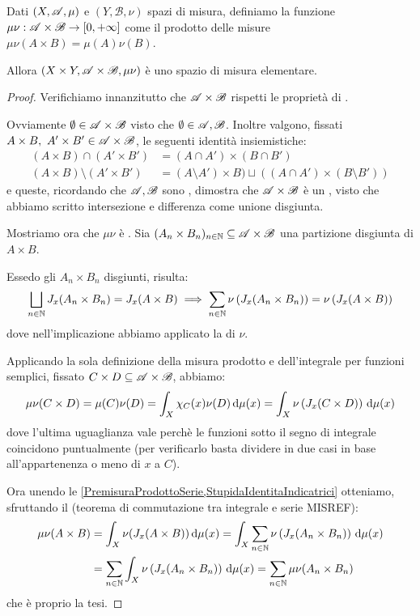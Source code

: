 \newcommand{\B}{\ensuremath{\mathscr B}}
\begin{theorem}
	Dati $(X,\mathscr A,\mu)$ e $(Y,\B,\nu)$ spazi di misura, definiamo la funzione $\mu\nu:\A\times\B\to\Rpiu$ come il prodotto delle misure $\mu\nu(A\times B)=\mu(A)\nu(B)$.
	
	Allora $(X\times Y,\A\times\B,\mu\nu)$ è uno spazio di misura elementare.
\end{theorem}
\begin{proof}
	Verifichiamo innanzitutto che $\A\times\B$ rispetti le proprietà di \semiring{}.
	
	Ovviamente $\emptyset\in\A\times\B$ visto che $\emptyset\in\A,\B$. 
	Inoltre valgono, fissati $A\times B,\ A'\times B'\in\A\times\B$, le seguenti identità insiemistiche:
	\begin{align*}
		(A\times B)\cap (A'\times B') &= (A\cap A')\times(B\cap B')\\
		(A\times B)\setminus (A'\times B') &= (A\setminus A')\times B)\sqcup( (A\cap A')\times (B\setminus B') )
	\end{align*}
	e queste, ricordando che $\A,\B$ sono \sigalg[e], dimostra che $\A\times\B$ è un \semiring{}, visto che abbiamo scritto intersezione e differenza come unione disgiunta.
	
	Mostriamo ora che $\mu\nu$ è \sigadd{}. Sia $(A_n\times B_n)_{n\in\N}\subseteq \A\times \B$ una partizione disgiunta di $A\times B$.
	
	Essedo gli $A_n\times B_n$ disgiunti, risulta:
	\begin{equation}\label{PremisuraProdottoSerie}
		\bigsqcup_{n\in\mathbb N} J_x(A_n\times B_n) = J_x(A\times B)  \implies \sum_{n\in\mathbb N}\nu\left(J_x(A_n\times B_n)\right)=\nu\left(J_x(A\times B)\right)
	\end{equation}
	dove nell'implicazione abbiamo applicato la \sigadd[ità] di $\nu$.
	
	Applicando la sola definizione della misura prodotto e dell'integrale per funzioni semplici, fissato $C\times D\subseteq \A\times\B$, abbiamo:
	\begin{equation}\label{StupidaIdentitaIndicatrici}
		\mu\nu(C\times D)=\mu(C)\nu(D)=\int_{X}\chi_C(x)\nu(D)\,\mathrm d \mu(x)=\int_X \nu\left(J_x(C\times D)\right)\,\mathrm d\mu(x)
	\end{equation}
	dove l'ultima uguaglianza vale perchè le funzioni sotto il segno di integrale coincidono puntualmente (per verificarlo basta dividere in due casi in base all'appartenenza o meno di $x$ a $C$).
	
	Ora unendo le \cref{PremisuraProdottoSerie,StupidaIdentitaIndicatrici} otteniamo, sfruttando il (teorema di commutazione tra integrale e serie MISREF):
	\begin{align*}
		\mu\nu(A\times B)&=\int_X\nu(J_x(A\times B))\,\mathrm d \mu(x)=\int_X\sum_{n\in\mathbb N}\nu\left(J_x(A_n\times B_n)\right)\,\mathrm d\mu(x)\\
		&=\sum_{n\in\mathbb N}\int_X\nu\left(J_x(A_n\times B_n)\right)\,\mathrm d\mu(x)=\sum_{n\in\mathbb N}\mu\nu(A_n\times B_n)
	\end{align*}
	che è proprio la tesi.
\end{proof}
